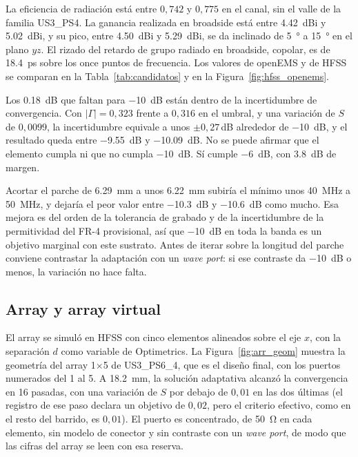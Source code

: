 \documentclass[11pt,a4paper]{article}
\begin{document}
La eficiencia de radiación está entre $0{,}742$ y $0{,}775$ en el canal, sin el valle de la familia US3\_PS4. La ganancia realizada en broadside está entre \SI{4.42}{dBi} y \SI{5.02}{dBi}, y su pico, entre \SI{4.50}{dBi} y \SI{5.29}{dBi}, se da inclinado de \SI{5}{\degree} a \SI{15}{\degree} en el plano $yz$. El rizado del retardo de grupo radiado en broadside, copolar, es de \SI{18.4}{ps} sobre los once puntos de frecuencia. Los valores de openEMS y de HFSS se comparan en la Tabla~\ref{tab:candidatos} y en la Figura~\ref{fig:hfss_openems}.

Los \SI{0.18}{dB} que faltan para \SI{-10}{dB} están dentro de la incertidumbre de convergencia. Con $|\Gamma| = 0{,}323$ frente a $0{,}316$ en el umbral, y una variación de $S$ de $0{,}0099$, la incertidumbre equivale a unos $\pm 0{,}27$\,dB alrededor de \SI{-10}{dB}, y el resultado queda entre \SI{-9.55}{dB} y \SI{-10.09}{dB}. No se puede afirmar que el elemento cumpla ni que no cumpla \SI{-10}{dB}. Sí cumple \SI{-6}{dB}, con \SI{3.8}{dB} de margen.

Acortar el parche de \SI{6.29}{mm} a unos \SI{6.22}{mm} subiría el mínimo unos \SI{40}{MHz} a \SI{50}{MHz}, y dejaría el peor valor entre \SI{-10.3}{dB} y \SI{-10.6}{dB} como mucho. Esa mejora es del orden de la tolerancia de grabado y de la incertidumbre de la permitividad del FR-4 provisional, así que \SI{-10}{dB} en toda la banda es un objetivo marginal con este sustrato. Antes de iterar sobre la longitud del parche conviene contrastar la adaptación con un \textit{wave port}: si ese contraste da \SI{-10}{dB} o menos, la variación no hace falta.

\subsection{Array y array virtual}\label{sec:resultados_array}
El array se simuló en HFSS con cinco elementos alineados sobre el eje $x$, con la separación $d$ como
variable de Optimetrics. La Figura~\ref{fig:arr_geom} muestra la geometría del array 1$\times$5 de
US3\_PS6\_4, que es el diseño final, con los puertos numerados del 1 al 5. A \SI{18.2}{mm}, la solución adaptativa alcanzó la convergencia en 16 pasadas, con una variación de $S$ por debajo de $0{,}01$ en las dos últimas (el registro de ese paso declara un objetivo de $0{,}02$, pero el criterio efectivo, como en el resto del barrido, es $0{,}01$). El puerto es concentrado, de \SI{50}{\ohm} en cada elemento, sin modelo de conector y sin contraste con un \textit{wave port}, de modo que las cifras del array se leen con esa reserva.
\end{document}
